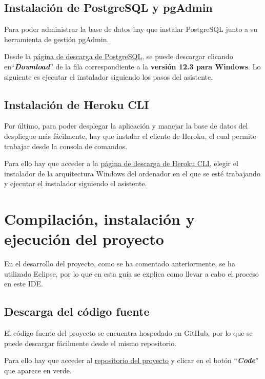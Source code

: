 \subsection{Instalación de PostgreSQL y pgAdmin}
Para poder administrar la base de datos hay que instalar PostgreSQL junto a su herramienta de gestión pgAdmin.

Desde la \href{https://www.enterprisedb.com/downloads/postgres-postgresql-downloads}{página de descarga de PostgreSQL}, se puede descargar clicando en``\textbf{\textit{Download}}'' de la fila correspondiente a la \textbf{versión 12.3 para Windows}. Lo siguiente es ejecutar el instalador siguiendo los pasos del asistente. 


\subsection{Instalación de Heroku CLI}
Por último, para poder desplegar la aplicación y manejar la base de datos del despliegue más fácilmente, hay que instalar el cliente de Heroku, el cual permite trabajar desde la consola de comandos.

Para ello hay que acceder a la \href{https://devcenter.heroku.com/articles/heroku-cli#download-and-install}{página de descarga de Heroku CLI}, elegir el instalador de la arquitectura Windows del ordenador en el que se esté trabajando y ejecutar el instalador siguiendo el asistente.


\section{Compilación, instalación y ejecución del proyecto}
En el desarrollo del proyecto, como se ha comentado anteriormente, se ha utilizado Eclipse, por lo que en esta guía se explica como llevar a cabo el proceso en este IDE.

\subsection{Descarga del código fuente}
El código fuente del proyecto se encuentra hospedado en GitHub, por lo que se puede descargar fácilmente desde el mismo repositorio.

Para ello hay que acceder al \href{https://github.com/lcs1001/gestion-aulas-informatica}{repositorio del proyecto} y clicar en el botón ``\textbf{\textit{Code}}'' que aparece en verde. 

